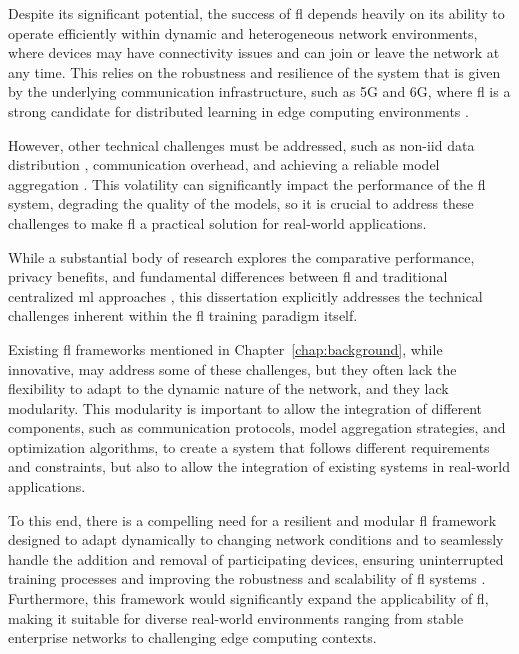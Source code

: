 Despite its significant potential, the success of \ac{fl} depends heavily on its ability to operate efficiently within dynamic and heterogeneous network environments, where devices may have connectivity issues and can join or leave the network at any time. This relies on the robustness and resilience of the system that is given by the underlying communication infrastructure, such as 5G and 6G, where \ac{fl} is a strong candidate for distributed learning in edge computing environments \cite{luo2023optimization}. 

However, other technical challenges must be addressed, such as \ac{non-iid} data distribution \cite{zhao2018federated}, communication overhead, and achieving a reliable model aggregation \cite{guendouzi2023systematic}. This volatility can significantly impact the performance of the \ac{fl} system, degrading the quality of the models, so it is crucial to address these challenges to make \ac{fl} a practical solution for real-world applications.

While a substantial body of research explores the comparative performance, privacy benefits, and fundamental differences between \ac{fl} and traditional centralized \ac{ml} approaches \cite{teixeira2025efficient}, this dissertation explicitly addresses the technical challenges inherent within the \ac{fl} training paradigm itself.

Existing \ac{fl} frameworks mentioned in Chapter~\ref{chap:background}, while innovative, may address some of these challenges, but they often lack the flexibility to adapt to the dynamic nature of the network, and they lack modularity. This modularity is important to allow the integration of different components, such as communication protocols, model aggregation strategies, and optimization algorithms, to create a system that follows different requirements and constraints, but also to allow the integration of existing systems in real-world applications.

To this end, there is a compelling need for a resilient and modular \ac{fl} framework designed to adapt dynamically to changing network conditions and to seamlessly handle the addition and removal of participating devices, ensuring uninterrupted training processes and improving the robustness and scalability of \ac{fl} systems \cite{chen2023dynamicfl}. Furthermore, this framework would significantly expand the applicability of \ac{fl}, making it suitable for diverse real-world environments ranging from stable enterprise networks to challenging edge computing contexts.


